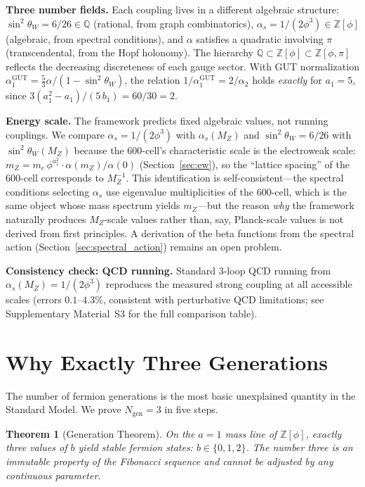 \documentclass[12pt,a4paper]{article}
\newtheorem{theorem}{Theorem}
\theoremstyle{definition}
\begin{document}
\textbf{Three number fields.} Each coupling lives in a different algebraic structure: $\sin^2\theta_W = 6/26 \in \mathbb{Q}$ (rational, from graph combinatorics), $\alpha_s = 1/(2\phi^3) \in \mathbb{Z}[\phi]$ (algebraic, from spectral conditions), and $\alpha$ satisfies a quadratic involving $\pi$ (transcendental, from the Hopf holonomy). The hierarchy $\mathbb{Q} \subset \mathbb{Z}[\phi] \subset \mathbb{Z}[\phi, \pi]$ reflects the decreasing discreteness of each gauge sector. With GUT normalization $\alpha_1^{\text{GUT}} = \tfrac{5}{3}\alpha/(1 - \sin^2\theta_W)$, the relation $1/\alpha_1^{\text{GUT}} = 2/\alpha_2$ holds \emph{exactly} for $a_1 = 5$, since $3(a_1^2 - a_1)/(5\,b_1) = 60/30 = 2$.

\textbf{Energy scale.} The framework predicts fixed algebraic values, not running couplings. We compare $\alpha_s = 1/(2\phi^3)$ with $\alpha_s(M_Z)$ and $\sin^2\theta_W = 6/26$ with $\sin^2\theta_W(M_Z)$ because the 600-cell's characteristic scale is the electroweak scale: $m_Z = m_e\,\phi^{a_1^2} \cdot \alpha(m_Z)/\alpha(0)$ (Section~\ref{sec:ew}), so the ``lattice spacing'' of the 600-cell corresponds to $M_Z^{-1}$. This identification is self-consistent---the spectral conditions selecting $\alpha_s$ use eigenvalue multiplicities of the 600-cell, which is the same object whose mass spectrum yields $m_Z$---but the reason \emph{why} the framework naturally produces $M_Z$-scale values rather than, say, Planck-scale values is not derived from first principles. A derivation of the beta functions from the spectral action (Section~\ref{sec:spectral_action}) remains an open problem.

\textbf{Consistency check: QCD running.} Standard 3-loop QCD running from $\alpha_s(M_Z) = 1/(2\phi^3)$ reproduces the measured strong coupling at all accessible scales (errors $0.1$--$4.3\%$, consistent with perturbative QCD limitations; see Supplementary Material~S3 for the full comparison table).


\section{Why Exactly Three Generations}
\label{sec:generations}

The number of fermion generations is the most basic unexplained quantity in the Standard Model. We prove $N_{\text{gen}} = 3$ in five steps.

\begin{theorem}[Generation Theorem]
On the $a = 1$ mass line of $\mathbb{Z}[\phi]$, exactly three values of $b$ yield stable fermion states: $b \in \{0, 1, 2\}$. The number three is an immutable property of the Fibonacci sequence and cannot be adjusted by any continuous parameter.
\end{theorem}
\end{document}

